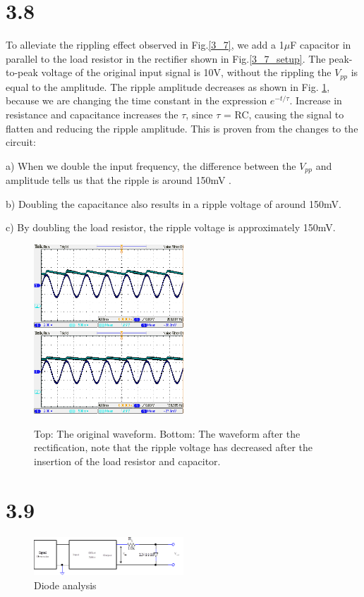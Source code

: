 \documentclass[authoryear, 12pt,5p, times]{elsarticle}
\begin{document}
\section*{3.8}
To alleviate the rippling effect observed in Fig.\ref{3_7}, we add a 1$\mu$F capacitor in parallel to the load resistor in the rectifier shown in Fig.\ref{3_7_setup}. The peak-to-peak voltage of the original input signal  is 10V, without the rippling the $V_{pp}$ is equal to the amplitude.
The ripple amplitude decreases as shown in Fig. \ref{ripple}, because we are changing the time constant in the expression $e^{-t/\tau}$. Increase in resistance and capacitance increases the $\tau$, since $\tau$ = RC, causing the signal to flatten and reducing the ripple amplitude. This is proven from the changes to the circuit: 
\par a) When we double the input frequency, %
the difference between the $V_{pp}$ and amplitude tells us that the ripple is around 150mV .  
\par  b) Doubling the capacitance also results in a ripple voltage of around 150mV.
\par c) By doubling the load resistor, the ripple voltage is approximately 150mV.
\begin{figure}[h!]
\center
\includegraphics[width=0.5\textwidth]{figure/TEK00015}
\includegraphics[width=0.5\textwidth]{figure/TEK00017}
\caption{Top: The original waveform. Bottom: The waveform after the rectification, note that the ripple voltage has decreased after the insertion of the load resistor and capacitor.}
\label{ripple}
\end{figure}

\section*{3.9}
\begin{figure}[h!]
\center
\includegraphics[width=0.5\textwidth]{figure/3_3_setup}
\caption{Diode analysis }
\label{3_9_setup}
\end{figure}
\end{document}
